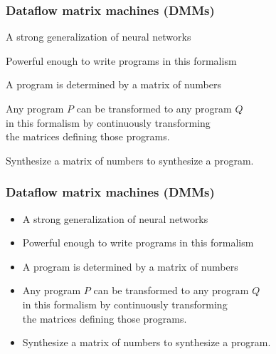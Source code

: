 \documentclass{beamer}
\newcommand{\msgray}[1]{{\color{mygray} #1}}
\begin{document}
\begin{frame}

\frametitle{Dataflow matrix machines (DMMs)}

\begin{itemize}

\item A strong generalization of neural networks\\[2ex]

\item Powerful enough  to write programs in this formalism\\[2ex]

\item A program is determined by a matrix of numbers\\[2ex]

\item Any program $P$ can be transformed to any program $Q$\\ in this formalism
        by continuously transforming\\ the matrices defining those programs.\\[2ex]

\msgray{\item Synthesize a matrix of numbers to synthesize a program.

}

\end{itemize}

\end{frame}

\begin{frame}

\frametitle{Dataflow matrix machines (DMMs)}

\begin{itemize}

\item A strong generalization of neural networks\\[2ex]

\item Powerful enough  to write programs in this formalism\\[2ex]

\item A program is determined by a matrix of numbers\\[2ex]

\item Any program $P$ can be transformed to any program $Q$\\ in this formalism
        by continuously transforming\\ the matrices defining those programs.\\[2ex]

\item Synthesize a matrix of numbers to synthesize a program.

\end{itemize}

\end{frame}
\end{document}
